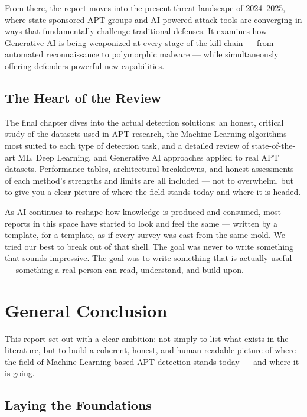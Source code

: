 ﻿\documentclass[11pt,a4paper]{report}
\begin{document}
From there, the report moves into the present threat landscape of
2024--2025, where state-sponsored APT groups and AI-powered attack tools are
converging in ways that fundamentally challenge traditional defenses. It
examines how Generative AI is being weaponized at every stage of the kill
chain --- from automated reconnaissance to polymorphic malware --- while
simultaneously offering defenders powerful new capabilities.

\section*{The Heart of the Review}

The final chapter dives into the actual detection solutions: an honest,
critical study of the datasets used in APT research, the Machine Learning
algorithms most suited to each type of detection task, and a detailed review
of state-of-the-art ML, Deep Learning, and Generative AI approaches applied
to real APT datasets. Performance tables, architectural breakdowns, and honest
assessments of each method's strengths and limits are all included --- not to
overwhelm, but to give you a clear picture of where the field stands today and
where it is headed.


As AI continues to reshape how knowledge is produced and consumed, most
reports in this space have started to look and feel the same --- written by
a template, for a template, as if every survey was cast from the same mold.
We tried our best to break out of that shell. The goal was never to write
something that sounds impressive. The goal was to write something that is
actually useful --- something a real person can read, understand, and build
upon.

\newpage



\chapter*{General Conclusion}

This report set out with a clear ambition: not simply to list what exists in
the literature, but to build a coherent, honest, and human-readable picture
of where the field of Machine Learning-based APT detection stands today ---
and where it is going.

\section*{Laying the Foundations}
\end{document}
